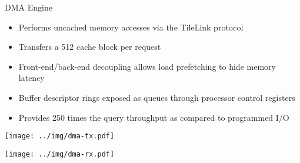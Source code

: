\begin{block}{DMA Engine}
\begin{itemize}
\footnotesize
\item Performs uncached memory accesses via the TileLink protocol
\item Transfers a \SI{512}{\bit} cache block per request
\item Front-end/back-end decoupling allows load prefetching to hide
	memory latency
\item Buffer descriptor rings exposed as queues through processor
	control registers
\item Provides 250 times the query throughput as compared to programmed I/O
\end{itemize}

\begin{multicols}{2}
\centering
\texttt{[image: ../img/dma-tx.pdf]}

\columnbreak

\centering
\texttt{[image: ../img/dma-rx.pdf]}
\end{multicols}
\end{block}
